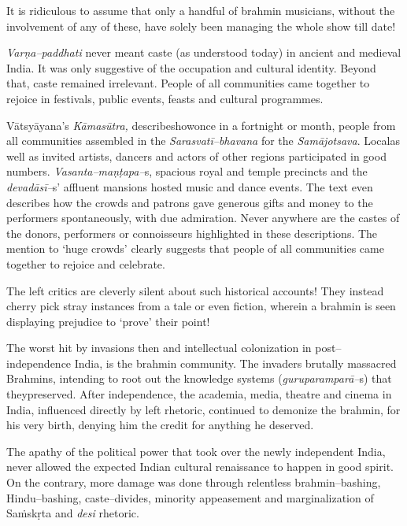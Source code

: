 It is ridiculous to assume that only a handful of brahmin musicians, without the involvement of any of these, have solely been managing the whole show till date!

\textit{Varṇa–paddhati} never meant caste (as understood today) in ancient and medieval India. It was only suggestive of the occupation and cultural identity. Beyond that, caste remained irrelevant. People of all communities came together to rejoice in festivals, public events, feasts and cultural programmes.

Vātsyāyana’s \textit{Kāmasūtra,} describeshowonce in a fortnight or month, people from all communities assembled in the \textit{Sarasvatī–bhavana} for the \textit{Samājotsava}. Localas well as invited artists, dancers and actors of other regions participated in good numbers. \textit{Vasanta–maṇṭapa–}s, spacious royal and temple precincts and the \textit{devadāsī–}s’ affluent mansions hosted music and dance events. The text even describes how the crowds and patrons gave generous gifts and money to the performers spontaneously, with due admiration. Never anywhere are the castes of the donors, performers or connoisseurs highlighted in these descriptions. The mention to ‘huge crowds’ clearly suggests that people of all communities came together to rejoice and celebrate.

The left critics are cleverly silent about such historical accounts! They instead cherry pick stray instances from a tale or even fiction, wherein a brahmin is seen displaying prejudice to ‘prove’ their point!

The worst hit by invasions then and intellectual colonization in post–independence India, is the brahmin community. The invaders brutally massacred Brahmins, intending to root out the knowledge systems (\textit{guru}\textit{paramparā–}s) that theypreserved. After independence, the academia, media, theatre and cinema in India, influenced directly by left rhetoric, continued to demonize the brahmin, for his very birth, denying him the credit for anything he deserved.

The apathy of the political power that took over the newly independent India, never allowed the expected Indian cultural renaissance to happen in good spirit. On the contrary, more damage was done through relentless brahmin–bashing, Hindu–bashing, caste–divides, minority appeasement and marginalization of Saṁskṛta and \textit{desi} rhetoric.

